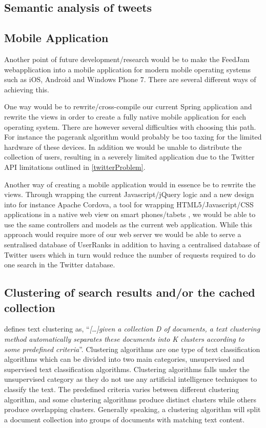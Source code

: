 \subsection{Semantic analysis of tweets} %
\label{semtanticAnalysation}

\subsection{Mobile Application}
Another point of future development/research would be to make the FeedJam webapplication into a mobile application for modern mobile operating systems such as iOS, Android and Windows Phone 7. There are several different ways of achieving this. 

One way would be to rewrite/cross-compile our current Spring application and rewrite the views in order to create a fully native mobile application for each operating system. There are however several difficulties with choosing this path. For instance the pagerank algorithm would probably be too taxing for the limited hardware of these devices. In addition we would be unable to distribute the collection of users, resulting in a severely limited application due to the Twitter API limitations outlined in \ref{twitterProblem}.

Another way of creating a mobile application would in essence be to rewrite the views. Through wrapping the current Javascript/jQuery logic and a new design into for instance Apache Cordova, a tool for wrapping HTML5/Javascript/CSS applications in a native web view on smart phones/tabets \cite{ApacheCordova}, we would be able to use the same controllers and models as the current web application. While this approach would require more of our web server we would be able to serve a sentralised database of UserRanks in addition to having a centralised database of Twitter users which in turn would reduce the number of requests required to do one search in the Twitter database.

\subsection{Clustering of search results and/or the cached collection} %
\citet[pg. 286]{Baeza-Yates2011} defines text clustering as, ``\textit{[\dots]given a collection D of documents, a text clustering method automatically separates these documents into K clusters according to some predefined criteria}''. Clustering algorithms are one type of text classification algorithms which can be divided into two main categories, unsupervised and supervised text classification algorithms. Clustering algorithms falls under the unsupervised category as they do not use any artificial intelligence techniques to classify the text. The predefined criteria varies between different clustering algorithm, and some clustering algorithms produce distinct clusters while others produce overlapping clusters. Generally speaking, a clustering algorithm will split a document collection into groups of documents with matching text content.

